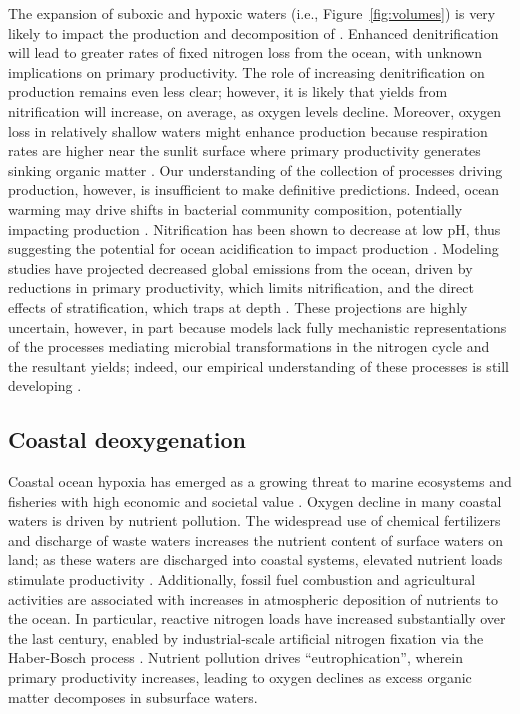 \documentclass[draft,linenumbers]{report_chapter}
\begin{document}
The expansion of suboxic and hypoxic waters (i.e., Figure~\ref{fig:volumes}) is very likely to impact the production and decomposition of .
Enhanced denitrification will lead to greater rates of fixed nitrogen loss from the ocean, with unknown implications on primary productivity.
The role of increasing denitrification on  production remains even less clear; however, it is likely that  yields from nitrification will increase, on average, as oxygen levels decline.
Moreover, oxygen loss in relatively shallow waters might enhance  production because respiration rates are higher near the sunlit surface where primary productivity generates sinking organic matter \citep{Codispoti-2010}.
Our understanding of the collection of processes driving  production, however, is insufficient to make definitive predictions.
Indeed, ocean warming may drive shifts in bacterial community composition, potentially impacting  production \citep{Freing-Wallace-etal-2012}.
Nitrification has been shown to decrease at low pH, thus suggesting the potential for ocean acidification to impact  production \citep{Beman-Chow-etal-2010}.
Modeling studies have projected decreased global  emissions from the ocean, driven by reductions in primary productivity, which limits nitrification, and the direct effects of stratification, which traps   at depth \citep{Martinez-Rey-Bopp-etal-2015}.
These projections are highly uncertain, however, in part because models lack fully mechanistic representations of the processes mediating microbial transformations in the nitrogen cycle and the resultant  yields; indeed, our empirical understanding of these processes is still developing \citep{Codispoti-2010}.

\subsection{Coastal deoxygenation}\label{loc:coastal}

Coastal ocean hypoxia has emerged as a growing threat to marine ecosystems and fisheries with high economic and societal value \citep{Diaz-Rosenberg-2008,McClatchie-Goericke-etal-2010}.
Oxygen decline in many coastal waters is driven by nutrient pollution.
The widespread use of chemical fertilizers and discharge of waste waters increases the nutrient content of surface waters on land; as these waters are discharged into coastal systems, elevated nutrient loads stimulate productivity \citep{Rabalais-Diaz-etal-2010}.
Additionally, fossil fuel combustion and agricultural activities are associated with increases in atmospheric deposition of nutrients to the ocean.
In particular, reactive nitrogen loads have increased substantially over the last century, enabled by industrial-scale artificial nitrogen fixation via the Haber-Bosch process \citep[e.g.,][]{Gruber-Galloway-2008}.
Nutrient pollution drives ``eutrophication'', wherein primary productivity increases, leading to oxygen declines as excess organic matter decomposes in subsurface waters.
\end{document}
